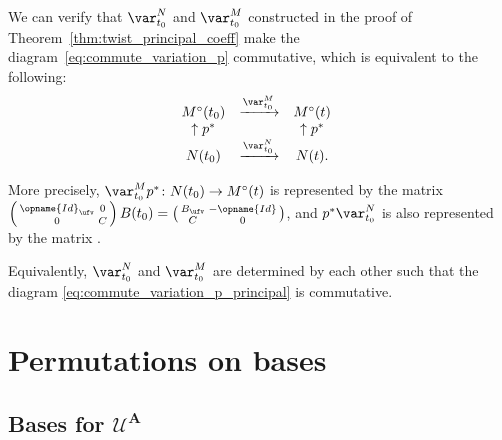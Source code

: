 \documentclass[pdftex]{sigma}
\newcommand{\Mc}{M^\circ}
\newcommand{\upClAlg}{\mathcal{U}^A}
\newcommand{\Id}{{\opname{Id}}}
\numberwithin{equation}{section}
\begin{document}
\begin{Example}
We can verify that $\var_{t_{0}}^{N}$ and $\var_{t_{0}}^{M}$ constructed
in the proof of Theorem~\ref{thm:twist_principal_coeff} make the
diagram~\eqref{eq:commute_variation_p} commutative, which is equivalent
to the following:
\begin{align}
\begin{array}{@{}ccc}
\Mc(t_{0}) & \xrightarrow{\var_{t_{0}}^{M}} & \Mc(t)\\
\uparrow p^{*} & & \uparrow p^{*}\\
N(t_{0}) & \xrightarrow{\var_{t_{0}}^{N}} & N(t).
\end{array}\label{eq:commute_variation_p_principal}
\end{align}

More precisely, $\var_{t_{0}}^{M}p^{*}\colon N(t_{0})\rightarrow\Mc(t)$
is represented by the matrix $\left(\begin{smallmatrix}
\Id_{\ufv} & 0\\
0 & C
\end{smallmatrix}\right)B(t_{0})=\left(\begin{smallmatrix}
B_{\ufv} & -\Id\\
C & 0
\end{smallmatrix}\right)$, and $p^{*}\var_{t_{0}}^{N}$ is also represented by the matrix \smash{$B(t)\left(\begin{smallmatrix}
\Id_{\ufv} & 0\\
0 & G
\end{smallmatrix}\right)=\left(\begin{smallmatrix}
B_{\ufv} & -\Id\\
C & 0
\end{smallmatrix}\right)$}.

Equivalently, $\var_{t_{0}}^{N}$ and $\var_{t_{0}}^{M}$ are determined
by each other such that the diagram \eqref{eq:commute_variation_p_principal}
is commutative.
\end{Example}

\section{Permutations on bases}\label{sec:Permutation-on-bases}

\subsection[Bases for U\^{}A]{Bases for $\boldsymbol{\upClAlg}$}\label{sec:permute_A_bases}
\end{document}
